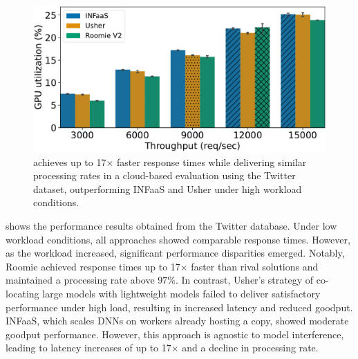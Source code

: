 \begin{figure}
\begin{minipage}[t]{.24\linewidth}
	\end{minipage}
	\hfill
	\begin{minipage}[t]{.24\linewidth}
		\centering
		\includegraphics[width=\linewidth]{chapters/roomie/images/NvidiaA100/twitter-all-models/gpu_utilization.pdf}
	\end{minipage}
	\caption{\roomie achieves up to 17$\times$ faster response times while delivering similar processing rates in a cloud-based evaluation using the Twitter dataset, outperforming INFaaS and Usher under high workload conditions.}
	\label{fig:NvidiaA100/twitter-all-models}
	\vspace{-3mm}
\end{figure}

 shows the performance results obtained from the Twitter database. Under low workload conditions, all approaches showed comparable response times. However, as the workload increased, significant performance disparities emerged. Notably, Roomie achieved response times up to 17× faster than rival solutions and maintained a processing rate above 97\%. In contrast, Usher's strategy of co-locating large models with lightweight models failed to deliver satisfactory performance under high load, resulting in increased latency and reduced goodput. INFaaS, which scales DNNs on workers already hosting a copy, showed moderate goodput performance. However, this approach is agnostic to model interference, leading to latency increases of up to 17× and a decline in processing rate.

